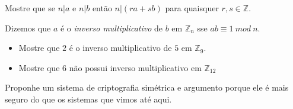 \begin{exercicio}
  Mostre que se $n|a$ e $n|b$ então $n|(ra + sb)$ para quaisquer $r, s \in \mathbb{Z}$.
\end{exercicio}

\begin{exercicio}
  Dizemos que $a$ é o {\em inverso multiplicativo} de $b$ em $\mathbb{Z}_n$ sse $ab \equiv 1\ mod\ n$.
\begin{itemize}
\item Mostre que $2$ é o inverso multiplicativo de $5$ em $\mathbb{Z}_9$.
\item Mostre que $6$ não possui inverso multiplicativo em $\mathbb{Z}_{12}$
\end{itemize}
\end{exercicio}

\begin{exercicio}
  Proponhe um sistema de criptografia simétrica e argumento porque ele é mais seguro do que os sistemas que vimos até aqui.
\end{exercicio}

